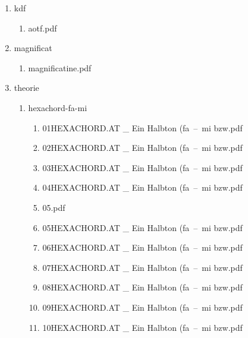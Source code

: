 \documentclass[11pt]{article}
\begin{document}
\begin{enumerate}
\begin{enumerate}
\item kdf
\label{sec-1-1-1-1-31-7-2-6}
\begin{enumerate}
\item aotf.pdf
\label{sec-1-1-1-1-31-7-2-6-1}
\end{enumerate}

\item magnificat
\label{sec-1-1-1-1-31-7-2-7}
\begin{enumerate}
\item magnificatine.pdf
\label{sec-1-1-1-1-31-7-2-7-1}
\end{enumerate}

\item theorie
\label{sec-1-1-1-1-31-7-2-8}
\begin{enumerate}
\item hexachord-fa-mi
\label{sec-1-1-1-1-31-7-2-8-1}
\begin{enumerate}
\item 01HEXACHORD.AT \_ Ein Halbton (fa – mi bzw.pdf
\label{sec-1-1-1-1-31-7-2-8-1-1}

\item 02HEXACHORD.AT \_ Ein Halbton (fa – mi bzw.pdf
\label{sec-1-1-1-1-31-7-2-8-1-2}

\item 03HEXACHORD.AT \_ Ein Halbton (fa – mi bzw.pdf
\label{sec-1-1-1-1-31-7-2-8-1-3}

\item 04HEXACHORD.AT \_ Ein Halbton (fa – mi bzw.pdf
\label{sec-1-1-1-1-31-7-2-8-1-4}

\item 05.pdf
\label{sec-1-1-1-1-31-7-2-8-1-5}

\item 05HEXACHORD.AT \_ Ein Halbton (fa – mi bzw.pdf
\label{sec-1-1-1-1-31-7-2-8-1-6}

\item 06HEXACHORD.AT \_ Ein Halbton (fa – mi bzw.pdf
\label{sec-1-1-1-1-31-7-2-8-1-7}

\item 07HEXACHORD.AT \_ Ein Halbton (fa – mi bzw.pdf
\label{sec-1-1-1-1-31-7-2-8-1-8}

\item 08HEXACHORD.AT \_ Ein Halbton (fa – mi bzw.pdf
\label{sec-1-1-1-1-31-7-2-8-1-9}

\item 09HEXACHORD.AT \_ Ein Halbton (fa – mi bzw.pdf
\label{sec-1-1-1-1-31-7-2-8-1-10}

\item 10HEXACHORD.AT \_ Ein Halbton (fa – mi bzw.pdf
\label{sec-1-1-1-1-31-7-2-8-1-11}


\end{enumerate}
\end{enumerate}
\end{enumerate}
\end{enumerate}
\end{document}
